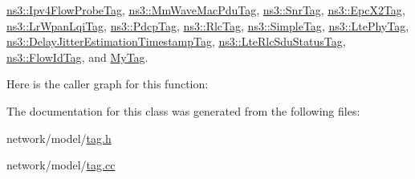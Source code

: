 \hyperlink{classns3_1_1Ipv4FlowProbeTag_a55fe37a15bf0074aa8ef331105302ac7}{ns3\+::\+Ipv4\+Flow\+Probe\+Tag}, \hyperlink{classns3_1_1MmWaveMacPduTag_aa1af1dad4141d8d0485a54908f989871}{ns3\+::\+Mm\+Wave\+Mac\+Pdu\+Tag}, \hyperlink{classns3_1_1SnrTag_a4bce5deac7781af66c6989a6c7ba2da9}{ns3\+::\+Snr\+Tag}, \hyperlink{classns3_1_1EpcX2Tag_ab3e9fce832d2bf9e7f72b6bd240d6c27}{ns3\+::\+Epc\+X2\+Tag}, \hyperlink{classns3_1_1LrWpanLqiTag_a8092c774492641bbbbf0b6e904255728}{ns3\+::\+Lr\+Wpan\+Lqi\+Tag}, \hyperlink{classns3_1_1PdcpTag_a0fad2a5aff62dc292909d9e9c22a1860}{ns3\+::\+Pdcp\+Tag}, \hyperlink{classns3_1_1RlcTag_affc948cb490c75300e091ba7c76f8c8b}{ns3\+::\+Rlc\+Tag}, \hyperlink{classns3_1_1SimpleTag_a0c5bdb3cd057cafb8e9f5fa7dda187e9}{ns3\+::\+Simple\+Tag}, \hyperlink{classns3_1_1LtePhyTag_aca99e0e411ac636fc85ce2a7ad7dae91}{ns3\+::\+Lte\+Phy\+Tag}, \hyperlink{classns3_1_1DelayJitterEstimationTimestampTag_a2611249cc61392fe151d5f758565eed9}{ns3\+::\+Delay\+Jitter\+Estimation\+Timestamp\+Tag}, \hyperlink{classns3_1_1LteRlcSduStatusTag_a9835f64e38fa949b0f66f7270abc41f7}{ns3\+::\+Lte\+Rlc\+Sdu\+Status\+Tag}, \hyperlink{classns3_1_1FlowIdTag_ae0e257200e8191c57ae464fe6900a4a0}{ns3\+::\+Flow\+Id\+Tag}, and \hyperlink{classMyTag_a97ed38c2e127611f4576ef7f194c30e5}{My\+Tag}.



Here is the caller graph for this function\+:




The documentation for this class was generated from the following files\+:\begin{DoxyCompactItemize}
\item 
network/model/\hyperlink{tag_8h}{tag.\+h}\item 
network/model/\hyperlink{tag_8cc}{tag.\+cc}\end{DoxyCompactItemize}
